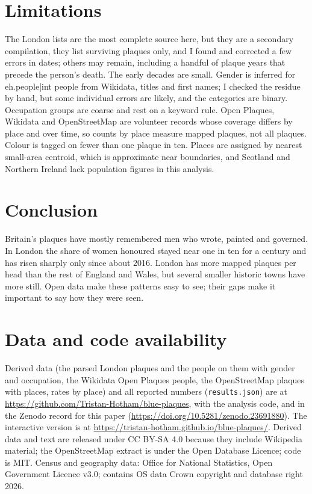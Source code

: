 \documentclass[11pt,a4paper]{article}
\begin{document}
\section{Limitations}

The London lists are the most complete source here, but they are a secondary compilation, they list surviving plaques only, and I found and corrected a few errors in dates; others may remain, including a handful of plaque years that precede the person's death. The early decades are small. Gender is inferred for {{eh.people|int}} people from Wikidata, titles and first names; I checked the residue by hand, but some individual errors are likely, and the categories are binary. Occupation groups are coarse and rest on a keyword rule. Open Plaques, Wikidata and OpenStreetMap are volunteer records whose coverage differs by place and over time, so counts by place measure mapped plaques, not all plaques. Colour is tagged on fewer than one plaque in ten. Places are assigned by nearest small-area centroid, which is approximate near boundaries, and Scotland and Northern Ireland lack population figures in this analysis.

\section{Conclusion}

Britain's plaques have mostly remembered men who wrote, painted and governed. In London the share of women honoured stayed near one in ten for a century and has risen sharply only since about 2016. London has more mapped plaques per head than the rest of England and Wales, but several smaller historic towns have more still. Open data make these patterns easy to see; their gaps make it important to say how they were seen.

\section*{Data and code availability}

Derived data (the parsed London plaques and the people on them with gender and occupation, the Wikidata Open Plaques people, the OpenStreetMap plaques with places, rates by place) and all reported numbers (\texttt{results.json}) are at \url{https://github.com/Tristan-Hotham/blue-plaques}, with the analysis code, and in the Zenodo record for this paper (\url{https://doi.org/10.5281/zenodo.23691880}). The interactive version is at \url{https://tristan-hotham.github.io/blue-plaques/}. Derived data and text are released under CC BY-SA 4.0 because they include Wikipedia material; the OpenStreetMap extract is under the Open Database Licence; code is MIT. Census and geography data: Office for National Statistics, Open Government Licence v3.0; contains OS data \textcopyright{} Crown copyright and database right 2026.
\end{document}
